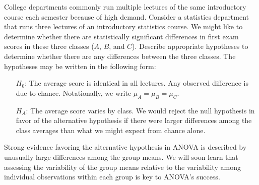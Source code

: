 \begin{example}{College departments commonly run multiple lectures of the same introductory course each semester because of high demand. Consider a statistics department that runs three lectures of an introductory statistics course. We might like to determine whether there are statistically significant differences in first exam scores in these three classes ($A$, $B$, and $C$). Describe appropriate hypotheses to determine whether there are any differences between the three classes.} \label{firstExampleForThreeStatisticsClassesAndANOVA}
The hypotheses may be written in the following form:
\begin{itemize}
\setlength{\itemsep}{0mm}
\item[$H_0$:] The average score is identical in all lectures. Any observed difference is due to chance. Notationally, we write $\mu_A=\mu_B=\mu_C$.
\item[$H_A$:] The average score varies by class. We would reject the null hypothesis in favor of the alternative hypothesis if there were larger differences among the class averages than what we might expect from chance alone.
\end{itemize}
\end{example}

Strong evidence favoring the alternative hypothesis in ANOVA is described by unusually large differences among the group means. We will soon learn that assessing the variability of the group means relative to the variability among individual observations within each group is key to ANOVA's success.

